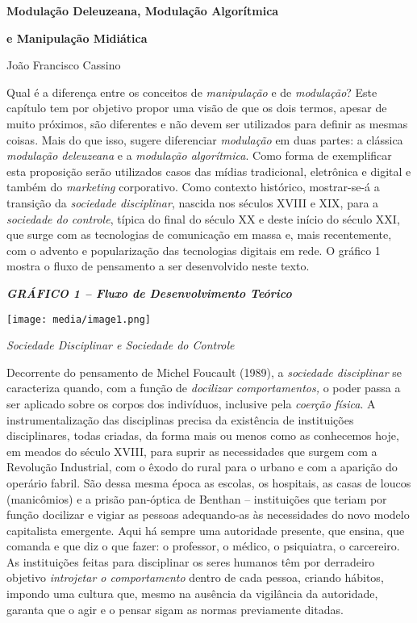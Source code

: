 \textbf{Modulação Deleuzeana, Modulação Algorítmica }

\textbf{e Manipulação Midiática}

João Francisco Cassino

Qual é a diferença entre os conceitos de \emph{manipulação} e de
\emph{modulação}? Este capítulo tem por objetivo propor uma visão de que
os dois termos, apesar de muito próximos, são diferentes e não devem ser
utilizados para definir as mesmas coisas. Mais do que isso, sugere
diferenciar \emph{modulação} em duas partes: a clássica \emph{modulação
deleuzeana} e a \emph{modulação algorítmica}. Como forma de exemplificar
esta proposição serão utilizados casos das mídias tradicional,
eletrônica e digital e também do \emph{marketing} corporativo. Como
contexto histórico, mostrar-se-á a transição da \emph{sociedade
disciplinar}, nascida nos séculos XVIII e XIX, para a \emph{sociedade do
controle}, típica do final do século XX e deste início do século XXI,
que surge com as tecnologias de comunicação em massa e, mais
recentemente, com o advento e popularização das tecnologias digitais em
rede. O gráfico 1 mostra o fluxo de pensamento a ser desenvolvido neste
texto.

\emph{\textbf{GRÁFICO 1 -- Fluxo de Desenvolvimento Teórico}}

\texttt{[image: media/image1.png]}

\emph{Sociedade Disciplinar e Sociedade do Controle}

Decorrente do pensamento de Michel Foucault (1989), a \emph{sociedade
disciplinar} se caracteriza quando, com a função de \emph{docilizar
comportamentos,} o poder passa a ser aplicado sobre os corpos dos
indivíduos, inclusive pela \emph{coerção física}. A instrumentalização
das disciplinas precisa da existência de instituições disciplinares,
todas criadas, da forma mais ou menos como as conhecemos hoje, em meados
do século XVIII, para suprir as necessidades que surgem com a Revolução
Industrial, com o êxodo do rural para o urbano e com a aparição do
operário fabril. São dessa mesma época as escolas, os hospitais, as
casas de loucos (manicômios) e a prisão pan-óptica de Benthan --
instituições que teriam por função docilizar e vigiar as pessoas
adequando-as às necessidades do novo modelo capitalista emergente. Aqui
há sempre uma autoridade presente, que ensina, que comanda e que diz o
que fazer: o professor, o médico, o psiquiatra, o carcereiro. As
instituições feitas para disciplinar os seres humanos têm por derradeiro
objetivo \emph{introjetar o comportamento} dentro de cada pessoa,
criando hábitos, impondo uma cultura que, mesmo na ausência da
vigilância da autoridade, garanta que o agir e o pensar sigam as normas
previamente ditadas.

